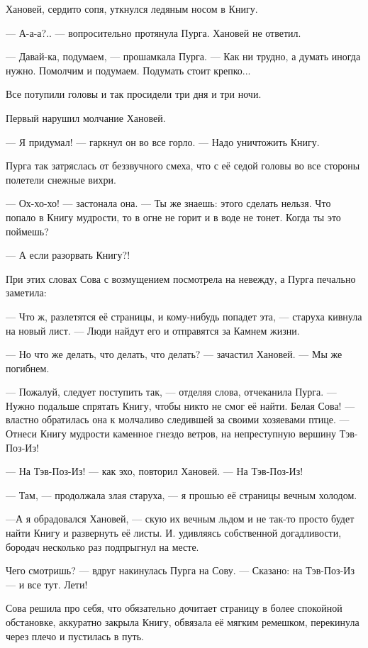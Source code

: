 \documentclass[oneside,final,14pt]{extreport}
\begin{document}
	Хановей, сердито сопя, уткнулся ледяным носом в Книгу.
	
	— А-а-а?.. — вопросительно протянула Пурга. Хановей не ответил.
	
	— Давай-ка, подумаем, — прошамкала Пурга. — Как ни трудно, а думать иногда нужно. Помолчим и подумаем. Подумать стоит крепко...
	
	Все потупили головы и так просидели три дня и три ночи.
	
	Первый нарушил молчание Хановей.
	
	— Я придумал! — гаркнул он во все горло. — Надо уничтожить Книгу.
	
	Пурга так затряслась от беззвучного смеха, что с её седой головы во все стороны полетели снежные вихри.
	
	— Ох-хо-хо! — застонала она. — Ты же знаешь: этого сделать нельзя. Что попало в Книгу мудрости, то в огне не горит и в воде не тонет. Когда ты это поймешь?
	
	— А если разорвать Книгу?!
	
	При этих словах Сова с возмущением посмотрела на невежду, а Пурга печально заметила:
	
	— Что ж, разлетятся её страницы, и кому-нибудь попадет эта, — старуха кивнула на новый лист. — Люди найдут его и отправятся за Камнем жизни.
	
	— Но что же делать, что делать, что делать? — зачастил Хановей. — Мы же погибнем.
	
	— Пожалуй, следует поступить так, — отделяя слова, отчеканила Пурга. — Нужно подальше спрятать Книгу, чтобы никто не смог её найти. Белая Сова! — властно обратилась она к молчаливо следившей за своими хозяевами птице. — Отнеси Книгу мудрости каменное гнездо ветров, на непреступную вершину Тэв-Поз-Из!
	
	— На Тэв-Поз-Из! — как эхо, повторил Хановей. — На Тэв-Поз-Из!
	
	— Там, — продолжала злая старуха, — я прошью её страницы вечным холодом.
	
	—А я обрадовался Хановей, — скую их вечным льдом и не так-то просто будет найти Книгу и развернуть её листы. И. удивляясь собственной догадливости, бородач несколько раз подпрыгнул на месте.
	
	Чего смотришь? — вдруг накинулась Пурга на Сову. — Сказано: на Тэв-Поз-Из — и все тут. Лети!
	
	Сова решила про себя, что обязательно дочитает страницу в более спокойной обстановке, аккуратно закрыла Книгу, обвязала её мягким ремешком, перекинула через плечо и пустилась в путь.
	
\end{document}
